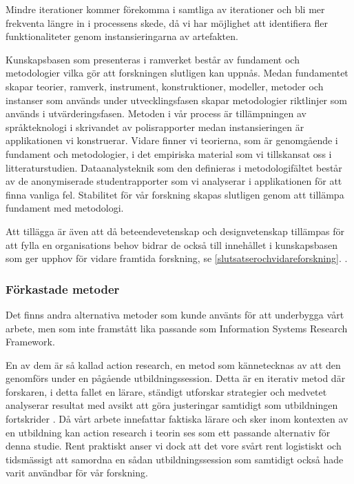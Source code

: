 \documentclass[swedish]{maucsthesis}
\begin{document}
Mindre iterationer kommer förekomma i samtliga av iterationer och bli mer frekventa längre in i processens skede, då vi har möjlighet att identifiera fler funktionaliteter genom instansieringarna av artefakten.

Kunskapsbasen som presenteras i ramverket består av fundament och metodologier vilka gör att forskningen slutligen kan uppnås. Medan fundamentet skapar teorier, ramverk, instrument, konstruktioner, modeller, metoder och instanser som används under utvecklingsfasen skapar metodologier riktlinjer som används i utvärderingsfasen. Metoden i vår process är tillämpningen av språkteknologi i skrivandet av polisrapporter medan instansieringen är applikationen vi konstruerar.
Vidare finner vi teorierna, som är genomgående i fundament och metodologier, i det empiriska material som vi tillskansat oss i litteraturstudien. Dataanalysteknik som den definieras i metodologifältet består av de anonymiserade studentrapporter som vi analyserar i applikationen för att finna vanliga fel. Stabilitet för vår forskning skapas slutligen genom att tillämpa fundament med metodologi. 

Att tillägga är även att då beteendevetenskap och designvetenskap tillämpas för att fylla en organisations behov bidrar de också till innehållet i kunskapsbasen som ger upphov för vidare framtida forskning, se \cref{slutsatserochvidareforskning}. \cite{hevner:2004}.

\subsubsection{Förkastade metoder}
Det finns andra alternativa metoder som kunde använts för att underbygga vårt
arbete, men som inte framstått lika
passande som Information Systems Research Framework.

En av dem är så kallad action research, en metod som kännetecknas av att den
genomförs under en pågående utbildningssession. Detta är en iterativ metod där
forskaren, i detta fallet en lärare, ständigt utforskar strategier och medvetet
analyserar resultat med avsikt att göra justeringar samtidigt som utbildningen
fortskrider \cite{clement:2004}. Då vårt arbete innefattar faktiska lärare och
sker inom kontexten av en utbildning kan action research i teorin ses som ett
passande alternativ för denna studie. Rent praktiskt anser vi dock att det vore
svårt rent logistiskt och tidsmässigt att samordna en sådan utbildningssession
som samtidigt också hade varit användbar för vår forskning.
\end{document}
